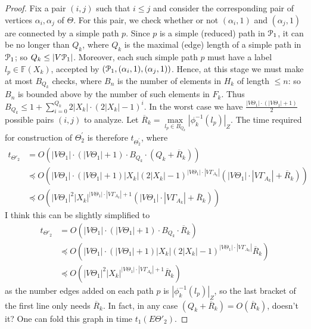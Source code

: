 \documentclass[a4paper,12pt]{article}
\renewcommand{\a}{\alpha }
\newcommand{\G}{\Gamma }
\newcommand{\T}{\Theta }
\newcommand{\cP}{{\cal{P}}}
\numberwithin{equation}{section}
\numberwithin{figure}{section}
\newcommand{\FF}{\ensuremath{\mathbb{F}}}
\begin{document}
\begin{proof}
Fix a pair $(i, j)$ such that $i \le j$ and consider the 
corresponding pair of vertices $\a_i,\a_j$ of $\T$. For this pair, we check 
whether or not $(\a_i,1)$ and $(\a_j,1)$ are 
connected by a  simple path $p$.  
Since $p$ is a
simple (reduced) path in $\cP_1$, it can be no longer than $Q_k$,
where $Q_k$ is the maximal (edge) length of a simple path in $\cP_1$;  
so $Q_k \le |V\cP_1|$. 
Moreover, each such  simple path $p$ must have a label $l_p \in \FF(X_k)$,
accepted by $(\cP_1,(\a_i,1),(\a_j,1))$. Hence, at
 this stage we must make 
at most $B_{Q_k}$ checks, where $B_n$ is the number of elements in
$H_k$ of length $\le n$: so $B_{n}$ is bounded above by
the number of such elements in $F_k$. Thus $B_{Q_k} \le 1+
\mathop{\sum}\limits_{i=0}^{Q_k} 2|X_k| \cdot (2|X_k|-1)^{i}$. In
the worst case we have $\frac{|V\T_1|\cdot(|V\T_1|+1)}{2}$
possible pairs $(i,j)$ to analyze. Let
$\overline{R}_k=\max\limits_{l_p \in
B_{Q_k}}|\phi^{-1}_k(l_p)|_Z$.
 The time required for construction of $\T_2^\prime$ is therefore $t_{\T_2^\prime}$, 
where  
\begin{equation}\label{theta'2}
\begin{split}
t_{\T'_2} &= O(|V\T_1|\cdot(|V\T_1|+1)\cdot B_{Q_k}\cdot (
Q_k + \overline{R}_k))\\ &\preceq
O(|V\T_1|\cdot(|V\T_1|+1)|X_k|(2|X_k|-1)^{|V\T_1|\cdot |V
\G_{A_k}|}(|V \T_1|\cdot |V \G_{A_k}| + \overline{R}_k))\\
&\preceq O(|V\T_1|^2|X_k|^{|V\T_1|\cdot |V \G_{A_k}|+1}(|V
\T_1|\cdot |V \G_{A_k}| + \overline{R}_k))
\end{split}
\end{equation}
{\ajd I think this can be slightly simplified to 
\[
\begin{split}
t_{\T'_2} &= O(|V\T_1|\cdot(|V\T_1|+1)\cdot B_{Q_k}
\cdot \overline{R}_k)\\ 
&\preceq
O(|V\T_1|\cdot(|V\T_1|+1)|X_k|(2|X_k|-1)^{|V\T_1|\cdot |V
\G_{A_k}|}\overline{R}_k)\\
&\preceq O(|V\T_1|^2|X_k|^{|V\T_1|\cdot |V \G_{A_k}|+1}\overline{R}_k)
\end{split}
\]
as the number edges added on each path $p$ is
$|\phi^{-1}_k(l_p)|_Z$, so the last bracket of the first line only needs
$\overline R_k$. In fact, in any case $(Q_k+\overline R_k)=O(\overline R_k)$, 
doesn't it?
}
One can fold this graph in time
$t_1(E\T'_2)$. 


\end{proof}
\end{document}
